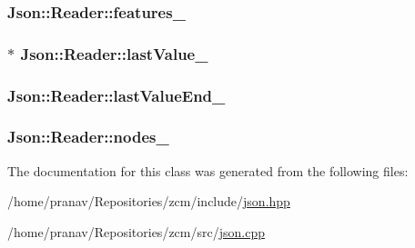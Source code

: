\subsubsection[{\texorpdfstring{features\+\_\+}{features_}}]{ Json\+::\+Reader\+::features\+\_\+\hspace{0.3cm}{\ttfamily [private]}}\hypertarget{classJson_1_1Reader_aa9984ff8f519b5541346157b7aebf97b}{}\label{classJson_1_1Reader_aa9984ff8f519b5541346157b7aebf97b}
\subsubsection[{\texorpdfstring{last\+Value\+\_\+}{lastValue_}}]{$\ast$ Json\+::\+Reader\+::last\+Value\+\_\+\hspace{0.3cm}{\ttfamily [private]}}\hypertarget{classJson_1_1Reader_a87cc75ae5adc6a6755f0ba1c7255ff6c}{}\label{classJson_1_1Reader_a87cc75ae5adc6a6755f0ba1c7255ff6c}
\subsubsection[{\texorpdfstring{last\+Value\+End\+\_\+}{lastValueEnd_}}]{ Json\+::\+Reader\+::last\+Value\+End\+\_\+\hspace{0.3cm}{\ttfamily [private]}}\hypertarget{classJson_1_1Reader_a497a114f7b760f1b794b8fff9876615a}{}\label{classJson_1_1Reader_a497a114f7b760f1b794b8fff9876615a}
\subsubsection[{\texorpdfstring{nodes\+\_\+}{nodes_}}]{ Json\+::\+Reader\+::nodes\+\_\+\hspace{0.3cm}{\ttfamily [private]}}\hypertarget{classJson_1_1Reader_ada3d2c47699dad662e6d156c8c78a6ac}{}\label{classJson_1_1Reader_ada3d2c47699dad662e6d156c8c78a6ac}


The documentation for this class was generated from the following files\+:\begin{DoxyCompactItemize}
\item 
/home/pranav/\+Repositories/zcm/include/\hyperlink{json_8hpp}{json.\+hpp}\item 
/home/pranav/\+Repositories/zcm/src/\hyperlink{json_8cpp}{json.\+cpp}\end{DoxyCompactItemize}
